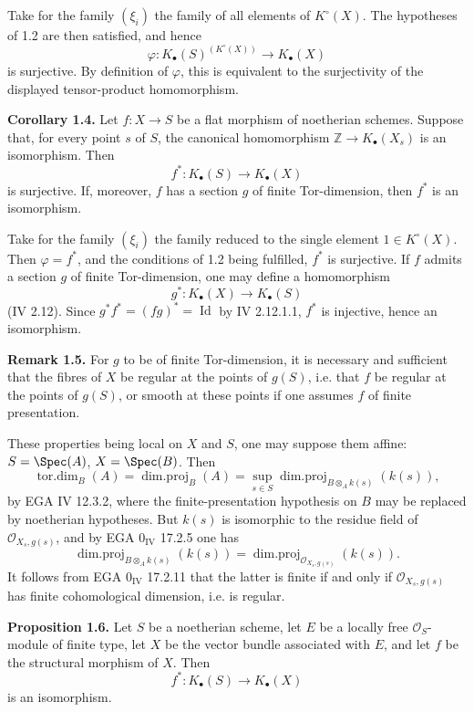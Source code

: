 Take for the family $(\xi_i)$ the family of all elements of $K^\circ(X)$. The hypotheses of 1.2 are then satisfied, and hence
\[
 \varphi:K_\bullet(S)^{(K^\circ(X))}\longrightarrow K_\bullet(X)
\]
is surjective. By definition of $\varphi$, this is equivalent to the surjectivity of the displayed tensor-product homomorphism.

\textbf{Corollary 1.4.} Let $f:X\to S$ be a flat morphism of noetherian schemes. Suppose that, for every point $s$ of $S$, the canonical homomorphism $\mathbb Z\to K_\bullet(X_s)$ is an isomorphism. Then
\[
 f^*:K_\bullet(S)\longrightarrow K_\bullet(X)
\]
is surjective. If, moreover, $f$ has a section $g$ of finite Tor-dimension, then $f^*$ is an isomorphism.

Take for the family $(\xi_i)$ the family reduced to the single element $1\in K^\circ(X)$. Then $\varphi=f^*$, and the conditions of 1.2 being fulfilled, $f^*$ is surjective. If $f$ admits a section $g$ of finite Tor-dimension, one may define a homomorphism
\[
 g^*:K_\bullet(X)\longrightarrow K_\bullet(S)
\]
(IV 2.12). Since $g^*f^*=(fg)^*=\operatorname{Id}$ by IV 2.12.1.1, $f^*$ is injective, hence an isomorphism.

\textbf{Remark 1.5.} For $g$ to be of finite Tor-dimension, it is necessary and sufficient that the fibres of $X$ be regular at the points of $g(S)$, i.e. that $f$ be regular at the points of $g(S)$, or smooth at these points if one assumes $f$ of finite presentation.

These properties being local on $X$ and $S$, one may suppose them affine: $S=\Spec(A)$, $X=\Spec(B)$. Then
\[
 \operatorname{tor.dim}_B(A)=\operatorname{dim.proj}_B(A)=\sup_{s\in S}\operatorname{dim.proj}_{B\otimes_A k(s)}(k(s)),
\]
by EGA IV 12.3.2, where the finite-presentation hypothesis on $B$ may be replaced by noetherian hypotheses. But $k(s)$ is isomorphic to the residue field of $\mathcal O_{X_s,g(s)}$, and by EGA $0_{\mathrm{IV}}$ 17.2.5 one has
\[
 \operatorname{dim.proj}_{B\otimes_A k(s)}(k(s))=
 \operatorname{dim.proj}_{\mathcal O_{X_s,g(s)}}(k(s)).
\]
It follows from EGA $0_{\mathrm{IV}}$ 17.2.11 that the latter is finite if and only if $\mathcal O_{X_s,g(s)}$ has finite cohomological dimension, i.e. is regular.

\textbf{Proposition 1.6.} Let $S$ be a noetherian scheme, let $E$ be a locally free $\mathcal O_S$-module of finite type, let $X$ be the vector bundle associated with $E$, and let $f$ be the structural morphism of $X$. Then
\[
 f^*:K_\bullet(S)\longrightarrow K_\bullet(X)
\]
is an isomorphism.

